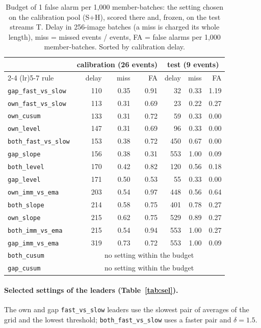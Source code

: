 \documentclass[10pt]{article}
\newcommand{\rl}[1]{\texttt{#1}}
\begin{document}
\begin{table}[ht]
  \centering\small
  \caption{Budget of 1 false alarm per 1,000 member-batches: the setting chosen on the calibration pool (S+H), scored there and, frozen, on the test streams T. Delay in 256-image batches (a miss is charged its whole length), miss = missed events / events, FA = false alarms per 1,000 member-batches. Sorted by calibration delay.}
  \label{tab:b1}
  \begin{tabular}{lrrrrrr}
    \toprule
    & \multicolumn{3}{c}{calibration (26 events)} & \multicolumn{3}{c}{test (9 events)} \\
    \cmidrule(lr){2-4} \cmidrule(lr){5-7}
    rule & delay & miss & FA & delay & miss & FA \\
    \midrule
    \rl{gap\_fast\_vs\_slow} & 110 & 0.35 & 0.91 & 32 & 0.33 & 1.19 \\
    \rl{own\_fast\_vs\_slow} & 113 & 0.31 & 0.69 & 23 & 0.22 & 0.27 \\
    \rl{own\_cusum} & 133 & 0.31 & 0.72 & 59 & 0.33 & 0.00 \\
    \rl{own\_level} & 147 & 0.31 & 0.69 & 96 & 0.33 & 0.00 \\
    \rl{both\_fast\_vs\_slow} & 153 & 0.38 & 0.72 & 450 & 0.67 & 0.00 \\
    \rl{gap\_slope} & 156 & 0.38 & 0.31 & 553 & 1.00 & 0.09 \\
    \rl{both\_level} & 170 & 0.42 & 0.82 & 120 & 0.56 & 0.18 \\
    \rl{gap\_level} & 171 & 0.50 & 0.53 & 55 & 0.33 & 0.00 \\
    \rl{own\_imm\_vs\_ema} & 203 & 0.54 & 0.97 & 448 & 0.56 & 0.64 \\
    \rl{both\_slope} & 214 & 0.58 & 0.75 & 401 & 0.78 & 0.27 \\
    \rl{own\_slope} & 215 & 0.62 & 0.75 & 529 & 0.89 & 0.27 \\
    \rl{both\_imm\_vs\_ema} & 215 & 0.54 & 0.94 & 553 & 1.00 & 0.27 \\
    \rl{gap\_imm\_vs\_ema} & 319 & 0.73 & 0.72 & 553 & 1.00 & 0.09 \\
    \rl{both\_cusum} & \multicolumn{6}{c}{no setting within the budget} \\
    \rl{gap\_cusum} & \multicolumn{6}{c}{no setting within the budget} \\
    \bottomrule
  \end{tabular}
\end{table}

\paragraph{Selected settings of the leaders (Table~\ref{tab:sel}).} The own and gap \rl{fast\_vs\_slow} leaders use the slowest pair of averages of the grid and the lowest threshold; \rl{both\_fast\_vs\_slow} uses a faster pair and $\delta = 1.5$.
\end{document}
